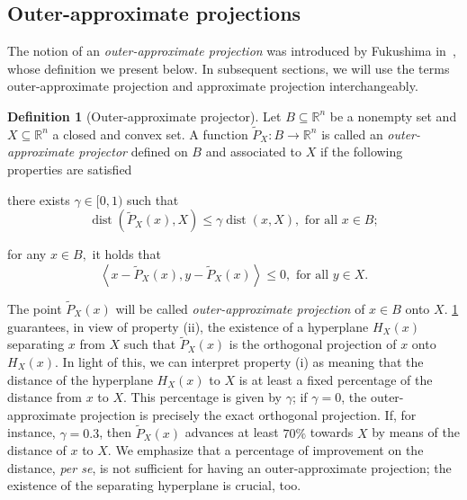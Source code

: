 \documentclass[smallextended,numbook,nospthms]{svjour3}
\theoremstyle{plain}
\theoremstyle{definition}
\newtheorem{definition}[theorem]{Definition}
\def\RR{\mathds R}
\DeclareMathOperator{\dist}{dist}
\newcommand{\scal}[2]{\left\langle{#1},{#2}  \right\rangle}
\begin{document}
\subsection{Outer-approximate projections}
The notion of an \emph{outer-approximate projection} was introduced by Fukushima in~\cite[Lemma 4]{Fukushima:1983}, whose definition we present below. In subsequent sections, we will use the terms outer-approximate projection and approximate projection interchangeably. 
\begin{definition}[Outer-approximate projector]\label{def:approx proj}
	Let $B \subseteq \RR^{n}$ be a nonempty set and $X \subseteq \RR^{n}$ a closed and convex set. A function $\tilde{P}_{X}: B \rightarrow \RR^{n}$ is called an \emph{outer-approximate projector} defined on $B$ and associated to $X$ if the following properties are satisfied
	\begin{listi}
		\item there exists $\gamma \in [0,1)$ such that
		\begin{equation}
			\dist\left(\tilde{P}_{X}(x), X\right) \leq \gamma \dist(x, X), \text { for all } x \in B;
		\end{equation}
		\item  for any $x \in B,$ it holds that
		\begin{equation}
			\scal{x-\tilde{P}_{X}(x)}{y-\tilde{P}_{X}(x)} \leq 0, \text { for all } y \in X.
		\end{equation}
	\end{listi}
\end{definition}

The point $\tilde{P}_{X}(x)$ will be called \emph{outer-approximate projection} of $x \in B$ onto $X$. \cref{def:approx proj} guarantees, in view of property (ii), the existence of a hyperplane $H_{X}(x)$ separating $x$ from $X$ such that $\tilde{P}_{X}(x)$ is the orthogonal projection of $x$ onto $H_{X}(x)$. In light of this, we can interpret property (i) as meaning that the distance of the hyperplane $H_{X}(x)$ to $X$ is at least a fixed percentage of the distance from $x$ to $X$. This percentage is given by $\gamma$; if $\gamma=0$, the outer-approximate projection is precisely the exact orthogonal projection. If, for instance, $\gamma = 0.3$, then $\tilde{P}_{X}(x)$ advances at least $70 \%$ towards $X$ by means of the distance of $x$ to $X$. We emphasize that a percentage of improvement on the distance, \emph{per se}, is not sufficient for having an outer-approximate projection; the existence of the separating hyperplane is crucial, too.
\end{document}
